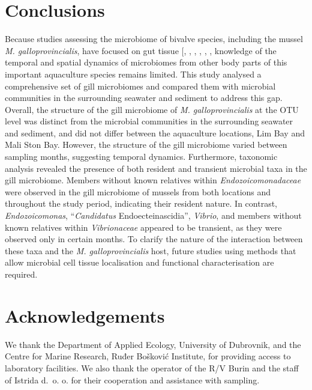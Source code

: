 \documentclass[
  12 pt,
]{article}
\begin{document}
\section{Conclusions}\label{conclusions}

Because studies assessing the microbiome of bivalve species, including the mussel \emph{M. galloprovincialis}, have focused on gut tissue {[}, , , , , \citeproc{ref-Wathsala2021}{30}{]}, knowledge of the temporal and spatial dynamics of microbiomes from other body parts of this important aquaculture species remains limited. This study analysed a comprehensive set of gill microbiomes and compared them with microbial communities in the surrounding seawater and sediment to address this gap. Overall, the structure of the gill microbiome of \emph{M. galloprovincialis} at the OTU level was distinct from the microbial communities in the surrounding seawater and sediment, and did not differ between the aquaculture locations, Lim Bay and Mali Ston Bay. However, the structure of the gill microbiome varied between sampling months, suggesting temporal dynamics. Furthermore, taxonomic analysis revealed the presence of both resident and transient microbial taxa in the gill microbiome. Members without known relatives within \emph{Endozoicomonadaceae} were observed in the gill microbiome of mussels from both locations and throughout the study period, indicating their resident nature. In contrast, \emph{Endozoicomonas}, ``\emph{Candidatus} Endoecteinascidia'', \emph{Vibrio}, and members without known relatives within \emph{Vibrionaceae} appeared to be transient, as they were observed only in certain months. To clarify the nature of the interaction between these taxa and the \emph{M. galloprovincialis} host, future studies using methods that allow microbial cell tissue localisation and functional characterisation are required.
\newpage

\section{Acknowledgements}\label{acknowledgements}

We thank the Department of Applied Ecology, University of Dubrovnik, and the Centre for Marine Research, Ruđer Bošković Institute, for providing access to laboratory facilities. We also thank the operator of the R/V Burin and the staff of Istrida d.~o. o. for their cooperation and assistance with sampling.
\end{document}
